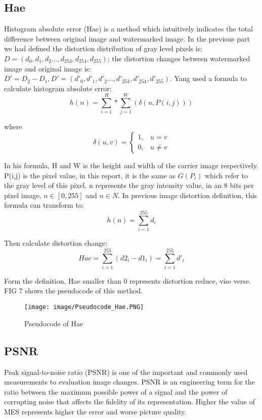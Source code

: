 \documentclass[%
    reprint,
    amsmath,amssymb,
    aps,
   ]{revtex4-1}
\begin{document}
   
   \subsection{\label{sec:level2}Hae}
   
   Histogram absolute error (Hae) is a method which intuitively indicates the total difference between original image and watermarked image. In the previous part we had defined the distortion distribution of gray level pixels is: \(D = (d_{0}, d_{1}, d_{2} … , d_{253}, d_{254}, d_{255})\); the distortion changes between watermarked image and original image is: \(D' = D_{2} - D_{1}, D' = (d'_{0}, d'_{1}, d'_{2} … , d'_{253}, d'_{254}, d'_{255})\). Yang \cite{ren2014image} used a formula to calculate histogram absolute error:
   $$h(n) = \sum_{i=1}^{H}*\sum_{j=1}^{W}(\delta(n,P(i,j)))$$
   
   where
   $$\delta(u,v) = \begin{cases} 1, & u = v \\ 
   0, & u \neq v \end{cases}$$
   
   In his formula, H and W is the height and width of the carrier image respectively. P(i,j) is the pixel value, in this report, it is the same as \(G(P_{i})\) which refer to the gray level of this pixel. n represents the gray intensity value, in an 8 bits per pixel image, \(n \in [0,255]\) and \(n\in N\). In previous image distortion definition, this formula can transform to:
   $$h(n) = \sum_{i=1}^{255} d_{i}$$
   
   Then calculate distortion change:
   $$Hae = \sum_{i=1}^{255} (d2_{i} - d1_{i}) = \sum_{i=1}^{255} d'_{i}$$
   
   Form the definition, Hae smaller than 0 represents distortion reduce, vise verse. FIG 7 shows the pseudocode of this method.
   
   \begin{figure}[h]
   \texttt{[image: image/Pseudocode\_Hae.PNG]}
   \caption{Pseudocode of Hae}
   \label{fig:figure}
   \end{figure}   
   
   
   
   \subsection{\label{sec:level2}PSNR}
   
   Peak signal-to-noise ratio (PSNR) is one of the important and commonly used measurements to evaluation image changes. PSNR is an engineering term for the ratio between the maximum possible power of a signal and the power of corrupting noise that affects the fidelity of its representation. Higher the value of MES represents higher the error and worse picture quality. \cite{eratne2009fast}
   
\end{document}
